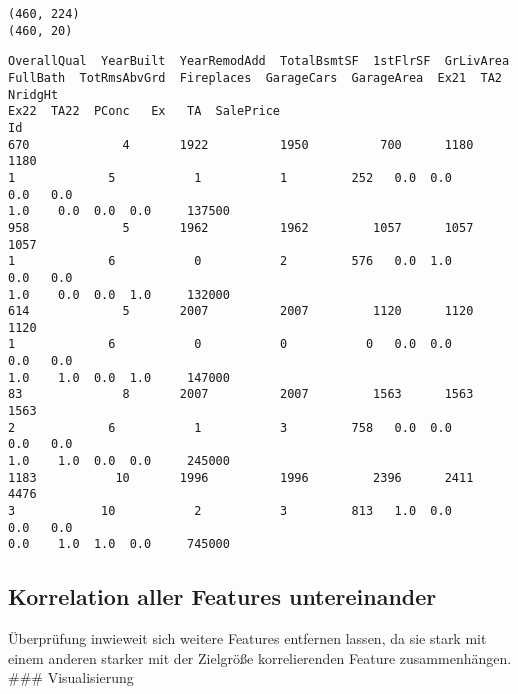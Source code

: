 \documentclass[paper=landscape]{scrartcl}
\makeatletter
\newcommand{\boxspacing}{\kern\kvtcb@left@rule\kern\kvtcb@boxsep}
\newcommand{\prompt}[4]{
        \ttfamily\llap{{\color{#2}[#3]:\hspace{3pt}#4}}\vspace{-\baselineskip}
    }
\makeatother
\begin{document}
    \begin{Verbatim}[commandchars=\\\{\}]
(460, 224)
(460, 20)
    \end{Verbatim}

            \begin{tcolorbox}[breakable, size=fbox, boxrule=.5pt, pad at break*=1mm, opacityfill=0]
\prompt{Out}{outcolor}{22}{\boxspacing}
\begin{Verbatim}[commandchars=\\\{\}]
      OverallQual  YearBuilt  YearRemodAdd  TotalBsmtSF  1stFlrSF  GrLivArea
FullBath  TotRmsAbvGrd  Fireplaces  GarageCars  GarageArea  Ex21  TA2  NridgHt
Ex22  TA22  PConc   Ex   TA  SalePrice
Id
670             4       1922          1950          700      1180       1180
1             5           1           1         252   0.0  0.0      0.0   0.0
1.0    0.0  0.0  0.0     137500
958             5       1962          1962         1057      1057       1057
1             6           0           2         576   0.0  1.0      0.0   0.0
1.0    0.0  0.0  1.0     132000
614             5       2007          2007         1120      1120       1120
1             6           0           0           0   0.0  0.0      0.0   0.0
1.0    1.0  0.0  1.0     147000
83              8       2007          2007         1563      1563       1563
2             6           1           3         758   0.0  0.0      0.0   0.0
1.0    1.0  0.0  0.0     245000
1183           10       1996          1996         2396      2411       4476
3            10           2           3         813   1.0  0.0      0.0   0.0
0.0    1.0  1.0  0.0     745000
\end{Verbatim}
\end{tcolorbox}
        
    \hypertarget{korrelation-aller-features-untereinander}{%
\subsection{Korrelation aller Features
untereinander}\label{korrelation-aller-features-untereinander}}

Überprüfung inwieweit sich weitere Features entfernen lassen, da sie
stark mit einem anderen starker mit der Zielgröße korrelierenden Feature
zusammenhängen. \#\#\# Visualisierung
\end{document}
